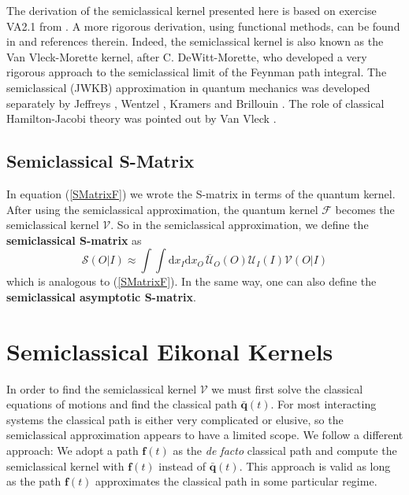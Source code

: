 The derivation of the semiclassical kernel presented here is based on exercise VA2.1 from \cite{Fields}. A more rigorous derivation, using functional methods, can be found in \cite{CartierMorette} and references therein. Indeed, the semiclassical kernel is also known as the Van Vleck-Morette kernel, after C. DeWitt-Morette, who developed a very rigorous approach to the semiclassical limit of the Feynman path integral. The semiclassical (JWKB) approximation in quantum mechanics was developed separately by Jeffreys \cite{Jeffreys}, Wentzel \cite{Wentzel}, Kramers \cite{Kramers} and Brillouin \cite{Brillouin}. The role of classical Hamilton-Jacobi theory was pointed out by Van Vleck \cite{VanVleck}.
\subsection{Semiclassical S-Matrix}
In equation (\ref{SMatrixF}) we wrote the S-matrix in terms of the quantum kernel. After using the semiclassical approximation, the quantum kernel $\mathcal{F}$ becomes the semiclassical kernel $\mathcal{V}$. So in the semiclassical approximation, we define the \textbf{semiclassical S-matrix} as
\begin{equation}
	\mathcal{S}(O|I) \approx \int \int \mathrm{d} x_{I} \mathrm{d} x_{O} \, \overline{\mathcal{U}}_{O}(O) \mathcal{U}_{I}(I) \mathcal{V}(O|I) \label{SemiSMatrix}
\end{equation}
which is analogous to (\ref{SMatrixF}). In the same way, one can also define the \textbf{semiclassical asymptotic S-matrix}.
\section{Semiclassical Eikonal Kernels}
In order to find the semiclassical kernel $\mathcal{V}$ we must first solve the classical equations of motions and find the classical path $\bar{\mathbf{q}}(t)$. For most interacting systems the classical path is either very complicated or elusive, so the semiclassical approximation appears to have a limited scope. We follow a different approach: We adopt a path $\mathbf{f}(t)$ as the \textit{de facto} classical path and compute the semiclassical kernel with $\mathbf{f}(t)$ instead of $\bar{\mathbf{q}}(t)$. This approach is valid as long as the path $\mathbf{f}(t)$ approximates the classical path in some particular regime.

